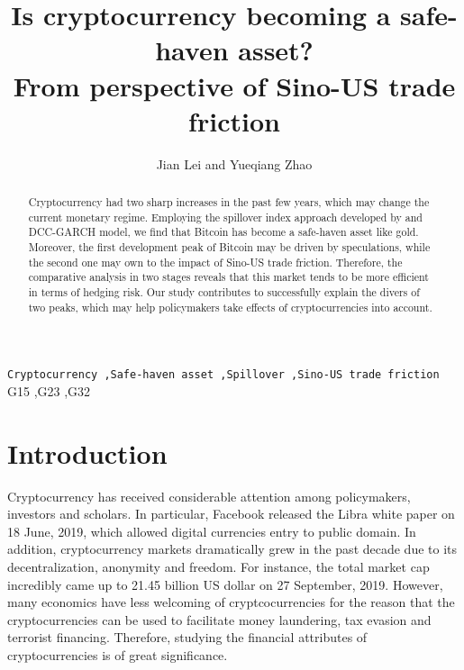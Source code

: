 \documentclass[review]{elsarticle}
\begin{document}
\begin{frontmatter}


\title{Is cryptocurrency becoming a safe-haven asset? \\From perspective of Sino-US trade friction}

\author{Jian Lei and Yueqiang Zhao }


\begin{abstract}
Cryptocurrency had two sharp increases in the past few years, which may change the current monetary regime. Employing the spillover index approach developed by \cite{Diebold2012} and DCC-GARCH model, we find that Bitcoin has become a safe-haven asset like gold. Moreover, the first development peak of Bitcoin may be driven by speculations, while the second one may own to the impact of Sino-US trade friction. Therefore, the comparative analysis in two stages reveals that this market tends to be more efficient in terms of hedging risk. Our study contributes to successfully explain the divers of two peaks, which may help policymakers take effects of cryptocurrencies into account.
\end{abstract}

\begin{keyword}
\texttt{Cryptocurrency \sep Safe-haven asset  \sep Spillover \sep Sino-US trade friction}
\JEL G15 \sep G23 \sep G32
\end{keyword}



\end{frontmatter}

\linenumbers

\section{Introduction}
Cryptocurrency has received considerable attention among policymakers, investors and scholars. In particular, Facebook released the Libra white paper on 18 June, 2019, which allowed digital currencies entry to public domain. In addition, cryptocurrency markets dramatically grew in the past decade due to its decentralization, anonymity and freedom. For instance, the total market cap  incredibly came up to 21.45 billion US dollar on 27 September, 2019. However, many economics have less welcoming of cryptcocurrencies for the reason that the cryptocurrencies can be used to facilitate money laundering, tax evasion and terrorist financing. Therefore, studying the financial attributes of cryptocurrencies is of great significance.
\end{document}
